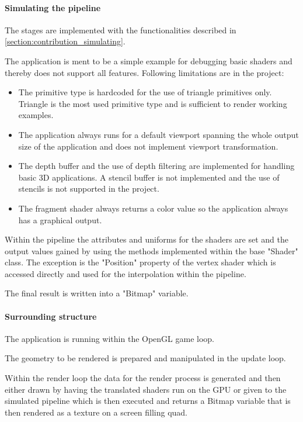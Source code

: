 \paragraph{Simulating the pipeline}

The stages are implemented with the functionalities described in \autoref{section:contribution_simulating}.

The application is ment to be a simple example for debugging basic shaders and thereby does not support all features. Following limitations are in the project:
\begin{itemize}
\item The primitive type is hardcoded for the use of triangle primitives only. Triangle is the most used primitive type and is sufficient to render working examples.
\item The application always runs for a default viewport spanning the whole output size of the application and does not implement viewport transformation.
\item The depth buffer and the use of depth filtering are implemented for handling basic 3D applications. A stencil buffer is not implemented and the use of stencils is not supported in the project.
\item The fragment shader always returns a color value so the application always has a graphical output.
\end{itemize}

Within the pipeline the attributes and uniforms for the shaders are set and the output values gained by using the methods implemented within the base "Shader" class. The exception is the "Position" property of the vertex shader which is accessed directly and used for the interpolation within the pipeline.

The final result is written into a "Bitmap" variable.

\paragraph{Surrounding structure}

The application is running within the OpenGL game loop.

The geometry to be rendered is prepared and manipulated in the update loop.

Within the render loop the data for the render process is generated and then either drawn by having the translated shaders run on the GPU or given to the simulated pipeline which is then executed and returns a Bitmap variable that is then rendered as a texture on a screen filling quad.

